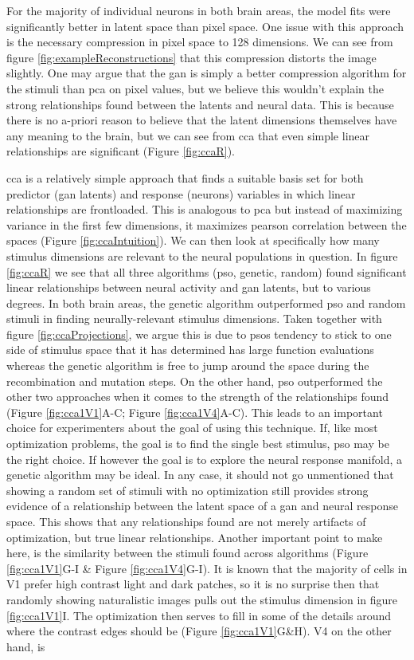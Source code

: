 For the majority of individual neurons in both brain areas, the model fits were significantly better in latent space than pixel space. One issue with this approach is the necessary compression in pixel space to 128 dimensions. We can see from figure \ref{fig:exampleReconstructions} that this compression distorts the image slightly. One may argue that the \gls{gan} is simply a better compression algorithm for the stimuli than \gls{pca} on pixel values, but we believe this wouldn't explain the strong relationships found between the latents and neural data. This is because there is no a-priori reason to believe that the latent dimensions themselves have any meaning to the brain, but we can see from \gls{cca} that even simple linear relationships are significant (Figure \ref{fig:ccaR}).

\gls{cca} is a relatively simple approach that finds a suitable basis set for both predictor (\gls{gan} latents) and response (neurons) variables in which linear relationships are frontloaded. This is analogous to \gls{pca} but instead of maximizing variance in the first few dimensions, it maximizes pearson correlation between the spaces (Figure \ref{fig:ccaIntuition}). We can then look at specifically how many stimulus dimensions are relevant to the neural populations in question. In figure \ref{fig:ccaR} we see that all three algorithms (\gls{pso}, genetic, random) found significant linear relationships between neural activity and \gls{gan} latents, but to various degrees. In both brain areas, the genetic algorithm outperformed \gls{pso} and random stimuli in finding neurally-relevant stimulus dimensions. Taken together with figure \ref{fig:ccaProjections}, we argue this is due to \glspl{pso} tendency to stick to one side of stimulus space that it has determined has large function evaluations whereas the genetic algorithm is free to jump around the space during the recombination and mutation steps. On the other hand, \gls{pso} outperformed the other two approaches when it comes to the strength of the relationships found (Figure \ref{fig:cca1V1}A-C; Figure \ref{fig:cca1V4}A-C). This leads to an important choice for experimenters about the goal of using this technique. If, like most optimization problems, the goal is to find the single best stimulus, \gls{pso} may be the right choice. If however the goal is to explore the neural response manifold, a genetic algorithm may be ideal. In any case, it should not go unmentioned that showing a random set of stimuli with no optimization still provides strong evidence of a relationship between the latent space of a \gls{gan} and neural response space. This shows that any relationships found are not merely artifacts of optimization, but true linear relationships. Another important point to make here, is the similarity between the stimuli found across algorithms (Figure \ref{fig:cca1V1}G-I \& Figure \ref{fig:cca1V4}G-I). It is known that the majority of cells in V1 prefer high contrast light and dark patches, so it is no surprise then that randomly showing naturalistic images pulls out the stimulus dimension in figure \ref{fig:cca1V1}I. The optimization then serves to fill in some of the details around where the contrast edges should be (Figure \ref{fig:cca1V1}G\&H). V4 on the other hand, is 